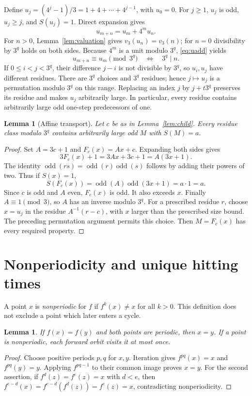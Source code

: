 \documentclass[11pt]{article}
\newtheorem{lemma}[theorem]{Lemma}
\begin{document}
Define $u_j=(4^j-1)/3=1+4+\cdots+4^{j-1}$, with $u_0=0$.
For $j\ge1$, $u_j$ is odd, $u_j\ge j$, and $S(u_j)=1$.
Direct expansion gives
\begin{equation}\label{eq:uadd}
 u_{m+n}=u_m+4^m u_n.
\end{equation}
For $n>0$, Lemma~\ref{lem:valuation} gives
$v_3(u_n)=v_3(n)$; for $n=0$ divisibility by $3^q$ holds on both sides.
Because $4^m$ is a unit modulo $3^q$, \eqref{eq:uadd} yields
\begin{equation}\label{eq:upermutation}
 u_{m+n}\equiv u_m\pmod{3^q}\quad\Longleftrightarrow\quad3^q\mid n.
\end{equation}
If $0\le i<j<3^q$, their difference $j-i$ is not divisible by $3^q$,
so $u_i,u_j$ have different residues. There are $3^q$ choices and $3^q$
residues; hence $j\mapsto u_j$ is a permutation modulo $3^q$ on this range.
Replacing an index $j$ by $j+t3^q$ preserves its residue and makes $u_j$
arbitrarily large. In particular, every residue contains arbitrarily
large odd one-step predecessors of one.

\begin{lemma}[Affine transport]\label{lem:affine}
Let $c$ be as in Lemma~\ref{lem:child}. Every residue class modulo $3^q$
contains arbitrarily large odd $M$ with $S(M)=a$.
\end{lemma}
\begin{proof}
Set $A=3c+1$ and $F_c(x)=Ax+c$. Expanding both sides gives
\[
 3F_c(x)+1=3Ax+3c+1=A(3x+1).
\]
The identity $\operatorname{odd}(rs)=\operatorname{odd}(r)
\operatorname{odd}(s)$ follows by adding their powers of two.
Thus if $S(x)=1$,
\[
 S(F_c(x))=\operatorname{odd}(A)\operatorname{odd}(3x+1)=a\cdot1=a.
\]
Since $c$ is odd and $A$ even, $F_c(x)$ is odd. It also exceeds $x$.
Finally $A\equiv1\pmod3$, so $A$ has an inverse modulo $3^q$.
For a prescribed residue $r$, choose $x=u_j$ in the residue
$A^{-1}(r-c)$, with $x$ larger than the prescribed size bound.
The preceding permutation argument permits this choice. Then $M=F_c(x)$
has every required property.
\end{proof}

\section{Nonperiodicity and unique hitting times}
A point $x$ is \emph{nonperiodic} for $f$ if $f^k(x)\ne x$ for all $k>0$.
This definition does not exclude a point which later enters a cycle.

\begin{lemma}\label{lem:periodic}
If $f(x)=f(y)$ and both points are periodic, then $x=y$.
If a point is nonperiodic, each forward orbit visits it at most once.
\end{lemma}
\begin{proof}
Choose positive periods $p,q$ for $x,y$. Iteration gives
$f^{pq}(x)=x$ and $f^{pq}(y)=y$. Applying $f^{pq-1}$ to their common
image proves $x=y$. For the second assertion, if
$f^d(z)=f^e(z)=x$ with $d<e$, then
$f^{e-d}(x)=f^{e-d}(f^d(z))=f^e(z)=x$, contradicting nonperiodicity.
\end{proof}
\end{document}
